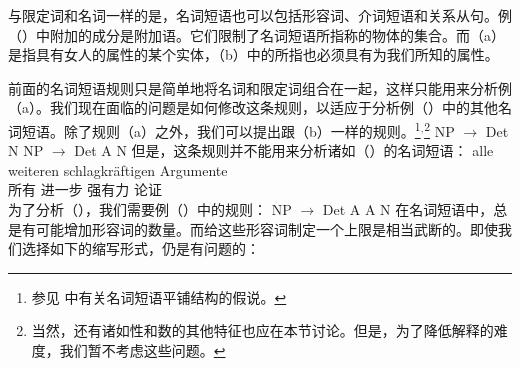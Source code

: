\noindent
与限定词和名词一样的是，名词短语也可以包括形容词、介词短语和关系从句。例（）中附加的成分是附加语。它们限制了名词短语所指称的物体的集合。而（a）是指具有女人的属性的某个实体，（b）中的所指也必须具有为我们所知的属性。

前面的名词短语规则只是简单地将名词和限定词组合在一起，这样只能用来分析例（a）。我们现在面临的问题是如何修改这条规则，以适应于分析例（）中的其他名词短语。除了规则（a）之外，我们可以提出跟（b）一样的规则。\footnote{%
参见 中有关名词短语平铺结构的假说。
}$^,$\footnote{%
当然，还有诸如性和数的其他特征也应在本节讨论。但是，为了降低解释的难度，我们暂不考虑这些问题。
}
\eal
\ex NP $\to$ Det N
\ex NP $\to$ Det A N
\zl
但是，这条规则并不能用来分析诸如（）的名词短语：
\ea
\label{Beispiel-alle-weitern-schlagkraeftigen-Argumente}
\gll alle weiteren schlagkräftigen Argumente\\
	 所有 进一步 强有力 论证\\
\z
为了分析（），我们需要例（）中的规则：
\ea 
NP $\to$ Det A A N
\z
在名词短语中，总是有可能增加形容词的数量。而给这些形容词制定一个上限是相当武断的。即使我们选择如下的缩写形式，仍是有问题的：

